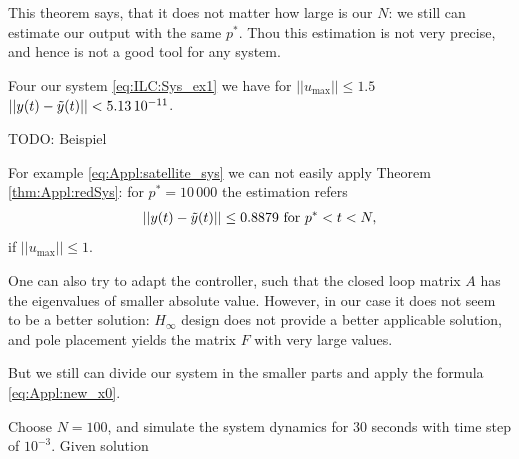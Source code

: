 	This theorem says, that it does not matter how large is our $N$: we still can estimate our output with the same $p^*$. 
	Thou this estimation is not very precise, and hence is not a good tool for any system. 
	
	\begin{exam}
		Four our system \eqref{eq:ILC:Sys_ex1} we have for $||u_{\max}||\leq 1.5$ 
		$||y(t) - \tilde{y}(t)|| < 5.13 \, 10^{-11}$. 
		
		TODO: Beispiel 
		
	\end{exam}

\begin{exam}
	For example \eqref{eq:Appl:satellite_sys} we can not easily apply Theorem \ref{thm:Appl:redSys}: for $p^* = 10 \, 000 $ the estimation refers 
	\begin{align}
	||y(t) - \tilde{y}(t)|| \leq 0.8879 \text{ for } p^* < t < N,
	\end{align}
	if $||u_{\max}|| \leq 1$.
	
	One can also try to adapt the controller, such that the closed loop matrix $A$ has the eigenvalues of smaller absolute value. However, in our case it does not seem to be a better solution: $H_\infty$ design does not provide a better applicable solution, and pole placement yields the matrix $F$ with very large values. 
	
	But we still can divide our system in the smaller parts and apply the formula \eqref{eq:Appl:new_x0}. 
	
	Choose $N = 100$, and simulate the system dynamics for 30 seconds with time step of $10^{-3}$. 
	Given solution 
	
	
\end{exam}
	
	
	
	
	